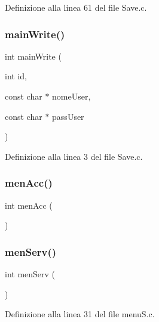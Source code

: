 Definizione alla linea 61 del file Save.\+c.

\mbox{\label{a00050_a686fdc51e62cecfde609bd7635ac4b4b}} 
\subsubsection{\texorpdfstring{mainWrite()}{mainWrite()}}
{\footnotesize\ttfamily int main\+Write (\begin{DoxyParamCaption}\item[{int}]{id,  }\item[{const char $\ast$}]{nome\+User,  }\item[{const char $\ast$}]{pass\+User }\end{DoxyParamCaption})}



Definizione alla linea 3 del file Save.\+c.

\mbox{\label{a00050_a24cd4cacf089f3d3ad9a0a95df6ed1f9}} 
\subsubsection{\texorpdfstring{menAcc()}{menAcc()}}
{\footnotesize\ttfamily int men\+Acc (\begin{DoxyParamCaption}{ }\end{DoxyParamCaption})}

\mbox{\label{a00050_a17b0f14b64d30c318b71f3c797009bef}} 
\subsubsection{\texorpdfstring{menServ()}{menServ()}}
{\footnotesize\ttfamily int men\+Serv (\begin{DoxyParamCaption}{ }\end{DoxyParamCaption})}



Definizione alla linea 31 del file menu\+S.\+c.

\mbox{\label{a00050_abd208224f708f66dffe535a706fb8f98}} 
